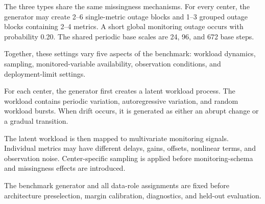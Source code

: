 \documentclass[11pt,a4paper]{article}
\begin{document}
The three types share the same missingness mechanisms.
For every center, the generator may create 2--6 single-metric outage
blocks and 1--3 grouped outage blocks containing 2--4 metrics.
A short global monitoring outage occurs with probability 0.20.
The shared periodic base scales are 24, 96, and 672 base steps.

Together, these settings vary five aspects of the benchmark: workload
dynamics, sampling, monitored-variable availability, observation conditions,
and deployment-limit settings.

For each center, the generator first creates a latent workload process.
The workload contains periodic variation, autoregressive variation, and
random workload bursts.
When drift occurs, it is generated as either an abrupt change or a gradual
transition.

The latent workload is then mapped to multivariate monitoring signals.
Individual metrics may have different delays, gains, offsets, nonlinear
terms, and observation noise.
Center-specific sampling is applied before monitoring-schema and missingness
effects are introduced.

The benchmark generator and all data-role assignments are fixed before
architecture preselection, margin calibration, diagnostics, and held-out
evaluation.
\end{document}
